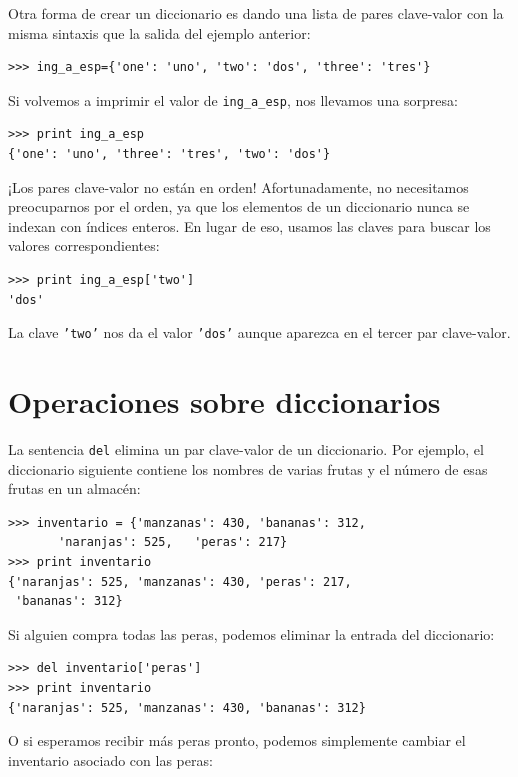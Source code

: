 Otra forma de crear un diccionario es dando una lista de pares clave-valor con la misma 
sintaxis que la salida del ejemplo anterior:

\beforeverb
\begin{verbatim}
>>> ing_a_esp={'one': 'uno', 'two': 'dos', 'three': 'tres'}
\end{verbatim}
\afterverb
%
Si volvemos a imprimir el valor de \texttt{ing\_a\_esp}, nos llevamos una sorpresa:

\beforeverb
\begin{verbatim}
>>> print ing_a_esp
{'one': 'uno', 'three': 'tres', 'two': 'dos'}
\end{verbatim}
\afterverb
%
¡Los pares clave-valor no están en orden! Afortunadamente, no necesitamos preocuparnos 
por el orden, ya que los elementos de un diccionario nunca se indexan con índices enteros. 
En lugar de eso, usamos las claves para buscar los valores correspondientes:

\beforeverb
\begin{verbatim}
>>> print ing_a_esp['two']
'dos'
\end{verbatim}
\afterverb
%
La clave \texttt{'two'} nos da el valor \texttt{'dos'} aunque aparezca en el 
tercer par clave-valor.


\section{Operaciones sobre diccionarios}

La sentencia \texttt{del} elimina un par clave-valor de un diccionario. Por ejemplo, 
el diccionario siguiente contiene los nombres de varias frutas y el número de esas 
frutas en un almacén:

\beforeverb
\begin{verbatim}
>>> inventario = {'manzanas': 430, 'bananas': 312, 
       'naranjas': 525,   'peras': 217}
>>> print inventario
{'naranjas': 525, 'manzanas': 430, 'peras': 217, 
 'bananas': 312}
\end{verbatim}
\afterverb
%
Si alguien compra todas las peras, podemos eliminar la entrada del diccionario:

\beforeverb
\begin{verbatim}
>>> del inventario['peras']
>>> print inventario
{'naranjas': 525, 'manzanas': 430, 'bananas': 312}
\end{verbatim}
\afterverb
%
O si esperamos recibir más peras pronto, podemos simplemente cambiar el inventario asociado con las peras:

